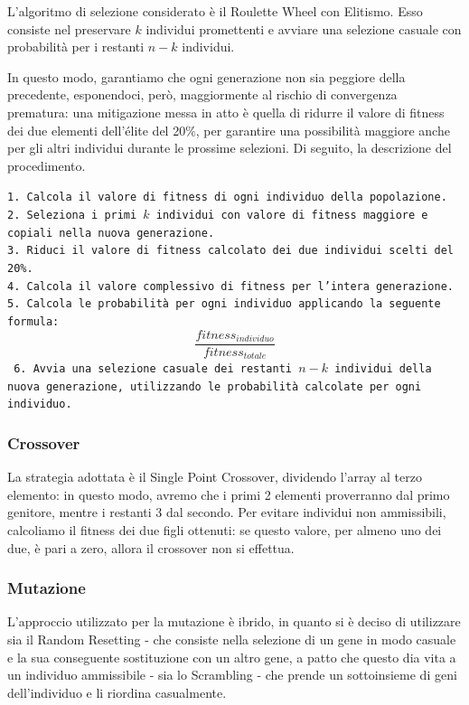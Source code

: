 \documentclass{CSUniSchoolLabReport}
\begin{document}
L'algoritmo di selezione considerato è il Roulette Wheel con Elitismo. Esso consiste nel preservare $k$ individui promettenti e avviare una selezione casuale con probabilità per i restanti $n-k$ individui.

In questo modo, garantiamo che ogni generazione non sia peggiore della precedente, esponendoci, però, maggiormente al rischio di convergenza prematura: una mitigazione messa in atto è quella di ridurre il valore di fitness dei due elementi dell'élite del 20\%, per garantire una possibilità maggiore anche per gli altri individui durante le prossime selezioni. Di seguito, la descrizione del procedimento.

\pagebreak{}

\texttt{1. Calcola il valore di fitness di ogni individuo della popolazione. \\
2. Seleziona i primi $k$ individui con valore di fitness maggiore e copiali nella nuova generazione. \\
3. Riduci il valore di fitness calcolato dei due individui scelti del 20\%. \\
4. Calcola il valore complessivo di fitness per l'intera generazione. \\
5. Calcola le probabilità per ogni individuo applicando la seguente formula: $$\frac{fitness_{individuo}}{fitness_{totale}}$$
6. Avvia una selezione casuale dei restanti $n-k$ individui della nuova generazione, utilizzando le probabilità calcolate per ogni individuo.
}

\subsubsection{Crossover}

La strategia adottata è il Single Point Crossover, dividendo l'array al terzo elemento: in questo modo, avremo che i primi 2 elementi proverranno dal primo genitore, mentre i restanti 3 dal secondo. Per evitare individui non ammissibili, calcoliamo il fitness dei due figli ottenuti: se questo valore, per almeno uno dei due, è pari a zero, allora il crossover non si effettua.

\subsubsection{Mutazione}

L'approccio utilizzato per la mutazione è ibrido, in quanto si è deciso di utilizzare sia il Random Resetting - che consiste nella selezione di un gene in modo casuale e la sua conseguente sostituzione con un altro gene, a patto che questo dia vita a un individuo ammissibile - sia lo Scrambling - che prende un sottoinsieme di geni dell'individuo e li riordina casualmente.
\end{document}
